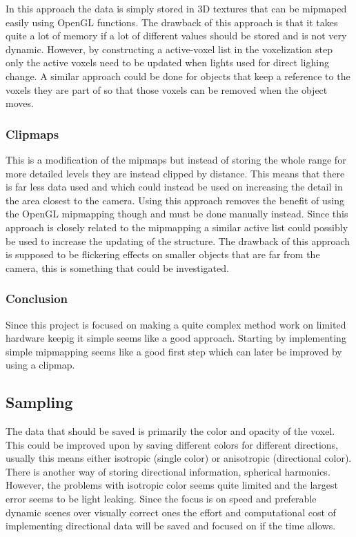 \documentclass[a4paper, 12pt]{article}
\begin{document}
In this approach the data is simply stored in 3D textures that can be mipmaped easily using OpenGL functions. The drawback of this approach is that it takes quite a lot of memory if a lot of different values should be stored and is not very dynamic. However, by constructing a active-voxel list in the voxelization step only the active voxels need to be updated when lights used for direct lighing change. A similar approach could be done for objects that keep a reference to the voxels they are part of so that those voxels can be removed when the object moves.

\subsubsection{Clipmaps}

This is a modification of the mipmaps but instead of storing the whole range for more detailed levels they are instead clipped by distance. This means that there is far less data used and which could instead be used on increasing the detail in the area closest to the camera. Using this approach removes the benefit of using the OpenGL mipmapping though and must be done manually instead. Since this approach is closely related to the mipmapping a similar active list could possibly be used to increase the updating of the structure. The drawback of this approach is supposed to be flickering effects on smaller objects that are far from the camera, this is something that could be investigated.

\subsubsection{Conclusion}

Since this project is focused on making a quite complex method work on limited hardware keepig it simple seems like a good approach. Starting by implementing simple mipmapping seems like a good first step which can later be improved by using a clipmap.

\subsection{Sampling}

The data that should be saved is primarily the color and opacity of the voxel. This could be improved upon by saving different colors for different directions, usually this means either isotropic (single color) or anisotropic (directional color). There is another way of storing directional information, spherical harmonics. However, the problems with isotropic color seems quite limited and the largest error seems to be light leaking. Since the focus is on speed and preferable dynamic scenes over visually correct ones the effort and computational cost of implementing directional data will be saved and focused on if the time allows.
\end{document}
